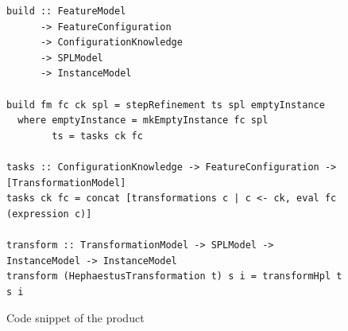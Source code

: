 \begin{figure}
\begin{lstlisting}
build :: FeatureModel
      -> FeatureConfiguration
      -> ConfigurationKnowledge
      -> SPLModel
      -> InstanceModel

build fm fc ck spl = stepRefinement ts spl emptyInstance
  where emptyInstance = mkEmptyInstance fc spl
        ts = tasks ck fc

tasks :: ConfigurationKnowledge -> FeatureConfiguration -> [TransformationModel]
tasks ck fc = concat [transformations c | c <- ck, eval fc (expression c)]

transform :: TransformationModel -> SPLModel -> InstanceModel -> InstanceModel
transform (HephaestusTransformation t) s i = transformHpl t s i
\end{lstlisting}
\caption{Code snippet of the \hp{} product}
\label{fig:code-hp-product}
\end{figure}


%
%
%
%
%
%

